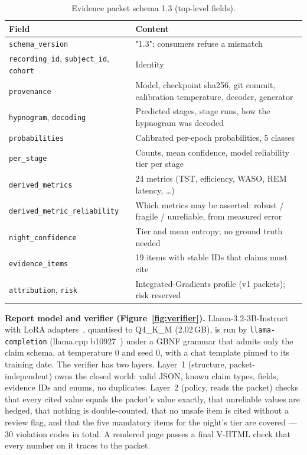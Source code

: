 \begin{table}[htbp]
\centering\small
\caption{Evidence packet schema 1.3 (top-level fields).}
\label{tab:packet}
\begin{tabularx}{\textwidth}{lY}
\toprule
Field & Content \\
\midrule
\texttt{schema\_version} & "1.3"; consumers refuse a mismatch \\
\texttt{recording\_id}, \texttt{subject\_id}, \texttt{cohort} & Identity \\
\texttt{provenance} & Model, checkpoint sha256, git commit, calibration temperature, decoder, generator \\
\texttt{hypnogram}, \texttt{decoding} & Predicted stages, stage runs, how the hypnogram was decoded \\
\texttt{probabilities} & Calibrated per-epoch probabilities, 5 classes \\
\texttt{per\_stage} & Counts, mean confidence, model reliability tier per stage \\
\texttt{derived\_metrics} & 24 metrics (TST, efficiency, WASO, REM latency, \ldots) \\
\texttt{derived\_metric\_reliability} & Which metrics may be asserted: robust / fragile / unreliable, from measured error \\
\texttt{night\_confidence} & Tier and mean entropy; no ground truth needed \\
\texttt{evidence\_items} & 19 items with stable IDs that claims must cite \\
\texttt{attribution}, \texttt{risk} & Integrated-Gradients profile (v1 packets); risk reserved \\
\bottomrule
\end{tabularx}
\end{table}

\textbf{Report model and verifier (Figure~\ref{fig:verifier}).} Llama-3.2-3B-Instruct~\cite{llama32} with LoRA
adapters~\cite{hu2022lora}, quantised to Q4\_K\_M (2.02\,GB), is run by \texttt{llama-completion} (llama.cpp
b10927~\cite{llamacpp}) under a GBNF grammar that admits only the claim schema, at temperature 0 and seed 0, with a
chat template pinned to its training date. The verifier has two layers. Layer~1 (structure, packet-independent)
owns the closed world: valid JSON, known claim types, fields, evidence IDs and enums, no duplicates. Layer~2
(policy, reads the packet) checks that every cited value equals the packet's value exactly, that unreliable values
are hedged, that nothing is double-counted, that no unsafe item is cited without a review flag, and that the five
mandatory items for the night's tier are covered --- 30 violation codes in total. A rendered page passes a final
V-HTML check that every number on it traces to the packet.

